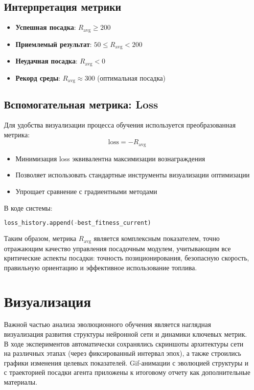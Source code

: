 \documentclass[a4paper,12pt]{article}
\begin{document}
\subsection{Интерпретация метрики}
\begin{itemize}
	\item \textbf{Успешная посадка}: $R_{\text{avg}} \geq 200$ 
	\item \textbf{Приемлемый результат}: $50 \leq R_{\text{avg}} < 200$
	\item \textbf{Неудачная посадка}: $R_{\text{avg}} < 0$
	\item \textbf{Рекорд среды}: $R_{\text{avg}} \approx 300$ (оптимальная посадка)
\end{itemize}

\subsection{Вспомогательная метрика: Loss}
Для удобства визуализации процесса обучения используется преобразованная метрика:
\[
\text{loss} = -R_{\text{avg}}
\]

\begin{itemize}
	\item Минимизация loss эквивалентна максимизации вознаграждения
	\item Позволяет использовать стандартные инструменты визуализации оптимизации
	\item Упрощает сравнение с градиентными методами
\end{itemize}

В коде системы:
\begin{lstlisting}[language=Python]
		loss_history.append(-best_fitness_current)
\end{lstlisting}

Таким образом, метрика $R_{\text{avg}}$ является комплексным показателем, точно отражающим качество управления посадочным модулем, учитывающим все критические аспекты посадки: точность позиционирования, безопасную скорость, правильную ориентацию и эффективное использование топлива.
\newpage
\section{Визуализация}

Важной частью анализа эволюционного обучения является наглядная визуализация развития структуры нейронной сети и динамики ключевых метрик. В ходе экспериментов автоматически сохранялись скриншоты архитектуры сети на различных этапах (через фиксированный интервал эпох), а также строились графики изменения целевых показателей. Gif-анимации с эволюцией структуры и с траекторией посадки агента приложены к итоговому отчету как дополнительные материалы.
\end{document}
